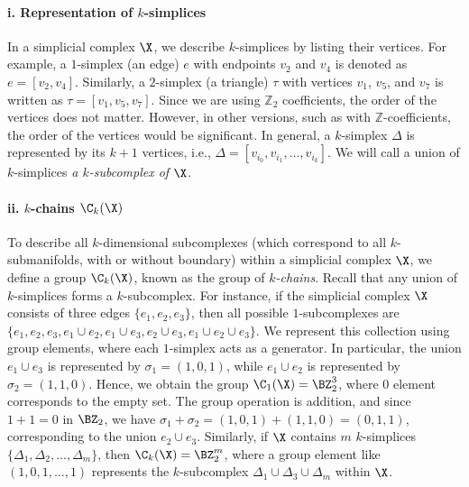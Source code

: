\paragraph*{i. Representation of $k$-simplices} In a simplicial complex $\X$, we describe $k$-simplices by listing their vertices. For example, a $1$-simplex (an edge) $e$ with endpoints $v_2$ and $v_4$ is denoted as $e = [v_2, v_4]$. Similarly, a $2$-simplex (a triangle) $\tau$ with vertices $v_1$, $v_5$, and $v_7$ is written as $\tau = [v_1, v_5, v_7]$. Since we are using $\mathbb{Z}_2$ coefficients, the order of the vertices does not matter. However, in other versions, such as with $\mathbb{Z}$-coefficients, the order of the vertices would be significant. In general, a $k$-simplex $\Delta$ is represented by its $k+1$ vertices, i.e., $\Delta = [v_{i_0}, v_{i_1}, \dots, v_{i_k}]$. We will call a union of $k$-simplices \textit{a $k$-subcomplex of $\X$}. 

\paragraph*{ii. $k$-chains $\C_k(\X)$} To describe all $k$-dimensional subcomplexes (which correspond to all $k$-submanifolds, with or without boundary) within a simplicial complex $\X$, we define a group $\C_k(\X)$, known as the group of {\em $k$-chains}. Recall that any union of $k$-simplices forms a $k$-subcomplex. For instance, if the simplicial complex $\X$ consists of three edges $\{e_1, e_2, e_3\}$, then all possible $1$-subcomplexes are $\{e_1, e_2, e_3, e_1 \cup e_2, e_1 \cup e_3, e_2 \cup e_3, e_1 \cup e_2 \cup e_3\}$. We represent this collection using group elements, where each $1$-simplex acts as a generator. In particular, the union $e_1 \cup e_3$ is represented by $\sigma_1 = (1,0,1)$, while $e_1 \cup e_2$ is represented by $\sigma_2 = (1,1,0)$. Hence, we obtain the group $\C_1(\X) = \BZ_2^3$, where $0$ element corresponds to the empty set. The group operation is addition, and since $1+1=0$ in $\BZ_2$, we have $\sigma_1 + \sigma_2 = (1,0,1) + (1,1,0) = (0,1,1)$, corresponding to the union $e_2 \cup e_3$. Similarly, if $\X$ contains $m$ $k$-simplices $\{\Delta_1, \Delta_2, \dots, \Delta_m\}$, then $\C_k(\X) = \BZ_2^m$, where a group element like $(1,0,1,\dots,1)$ represents the $k$-subcomplex $\Delta_1 \cup \Delta_3 \cup \Delta_m$ within $\X$.



